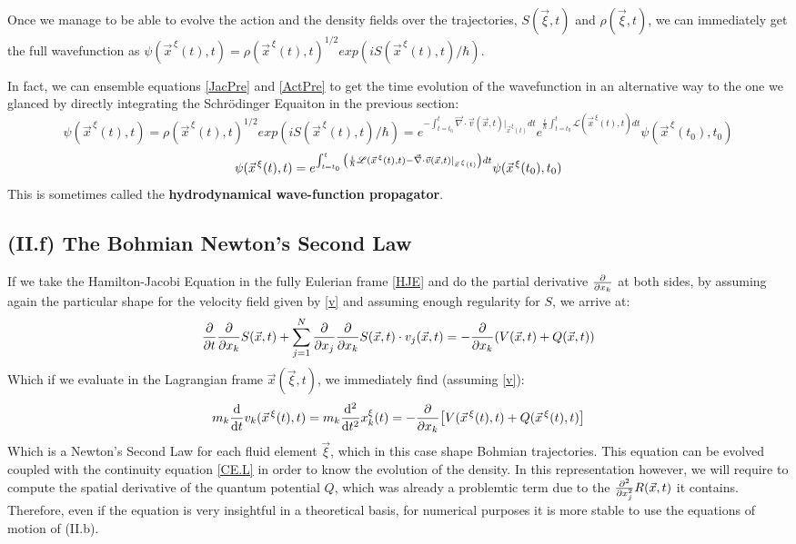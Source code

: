 \documentclass[11pt, a4paper]{article} %
\newcommand{\Lg}{\mathscr{L}}
\begin{document}
Once we manage to be able to evolve the action and the density fields over the trajectories, $S(\vec{\xi},t)$ and $\rho(\vec{\xi},t)$, we can immediately get the full wavefunction as $\psi(\vec{x}^{\, \xi}(t),t)=\rho(\vec{x}^{\, \xi}(t),t)^{1/2}exp(iS(\vec{x}^{\, \xi}(t),t)/\hbar)$.

In fact, we can ensemble equations \eqref{JacPre} and \eqref{ActPre} to get the time evolution of the wavefunction in an alternative way to the one we glanced by directly integrating the Schrödinger Equaiton in the previous section:
\begin{equation}
\psi(\vec{x}^{\, \xi}(t),t)=\rho(\vec{x}^{\, \xi}(t),t)^{1/2}exp(iS(\vec{x}^{\, \xi}(t),t)/\hbar)=e^{-\int_{t=t_0}^t \vec{\nabla}\cdot \vec{v}(\vec{x},t)\rvert_{\vec{x}^{\, \xi}(t)} dt}e^{\frac{i}{\hbar}\int_{t=t_0}^t \Lg(\vec{x}^{\, \xi}(t),t) dt}\psi(\vec{x}^{\, \xi}(t_0),t_0)
\end{equation}
$$
\psi(\vec{x}^{\, \xi}(t),t)=e^{\int_{t=t_0}^t\qty( \frac{i}{\hbar} \Lg(\vec{x}^{\, \xi}(t),t)- \vec{\nabla}\cdot \vec{v}(\vec{x},t)\rvert_{\vec{x}^{\, \xi}(t)} )dt}\psi(\vec{x}^{\, \xi}(t_0),t_0)
$$
This is sometimes called the {\bf hydrodynamical wave-function propagator}.\vspace{-0.2cm}


\subsection*{(II.f) The Bohmian Newton's Second Law}
If we take the Hamilton-Jacobi Equation in the fully Eulerian frame \eqref{HJE} and do the partial derivative $\pdv{}{x_k}$ at both sides, by assuming again the particular shape for the velocity field given by \eqref{v} and assuming enough regularity for $S$, we arrive at:
\begin{equation}
\pdv{}{t}\pdv{}{x_k}S(\vec{x},t)+\sum_{j=1}^N\pdv{}{x_j}\pdv{}{x_k}S(\vec{x},t)\cdot v_j(\vec{x},t)=-\pdv{}{x_k}\qty(V(\vec{x},t)+Q(\vec{x},t))
\end{equation}
Which if we evaluate in the Lagrangian frame $\vec{x}(\vec{\xi},t)$, we immediately find (assuming \eqref{v}):
\begin{equation}
m_k\dv{}{t}v_k(\vec{x}^{\, \xi}(t),t)=m_k\dv[2]{}{t}x^\xi_k(t)=-\pdv{}{x_k}\qty[V(\vec{x}^{\, \xi}(t),t)+Q(\vec{x}^{\, \xi}(t),t) ]\vspace{-0.1cm}
\end{equation}
Which is a Newton's Second Law for each fluid element $\vec{\xi}$, which in this case shape Bohmian trajectories. This equation can be evolved coupled with the continuity equation \eqref{CE.L} in order to know the evolution of the density. In this representation however, we will require to compute the spatial derivative of the quantum potential $Q$, which was already a problemtic term due to the $\pdv[2]{}{x_j}R(\vec{x},t)$ it contains. Therefore, even if the equation is very insightful in a theoretical basis, for numerical purposes it is more stable to use the equations of motion of (II.b).\vspace{-0.2cm}
\end{document}
